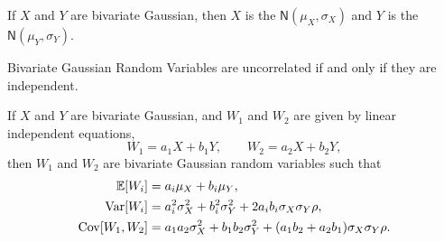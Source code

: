 \begin{theorem}
    If $X$ and $Y$ are bivariate Gaussian, then $X$ is the $\mathsf{N}(\mu_X, \sigma_X)$ and $Y$ is the $\mathsf{N}(\mu_Y, \sigma_Y)$.
\end{theorem}

\begin{theorem}
    Bivariate Gaussian Random Variables are uncorrelated if and only if they are independent.
\end{theorem}

\begin{theorem}
    If $X$ and $Y$ are bivariate Gaussian, and $W_1$ and $W_2$ are given by linear independent equations,
    \[W_1=a_1X+b_1Y, \qquad W_2=a_2X+b_2Y,\]
    then $W_1$ and $W_2$ are bivariate Gaussian random variables such that
    \begin{align*}
        \E{W_i} &= a_i\mu_X+b_i\mu_Y, \\
        \Var[W_i] &= a_i^2\sigma_X^2+b_i^2\sigma_Y^2+2a_ib_i\sigma_X\sigma_Y\rho, \\
        \Cov[W_1,W_2] &= a_1a_2\sigma_X^2+b_1b_2\sigma_Y^2+(a_1b_2+a_2b_1)\sigma_X\sigma_Y\rho.
    \end{align*}
\end{theorem}




